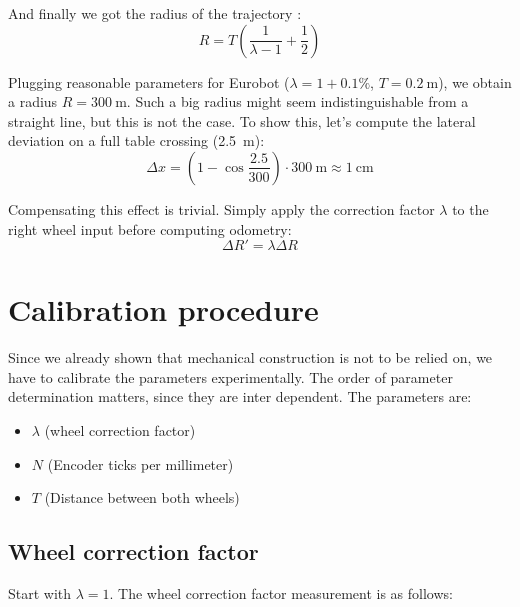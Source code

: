 \documentclass[a4paper, 10pt]{article}
\begin{document}
And finally we got the radius of the trajectory :
\begin{equation*}
    R = T \left(\frac{1}{\lambda - 1}  + \frac{1}{2}\right)
\end{equation*}

Plugging reasonable parameters for Eurobot ($\lambda=1+0.1\%$, $T = \SI{0.2}{\meter}$), we obtain a radius $R = \SI{300}{\meter}$.
Such a big radius might seem indistinguishable from a straight line, but this is not the case.
To show this, let's compute the lateral deviation on a full table crossing (\SI{2.5}{\meter}):
\begin{equation*}
    \Delta x = \left( 1 - \cos \frac{2.5}{300} \right) \cdot \SI{300}{\meter} \approx \SI{1}{\centi\meter}
\end{equation*}


Compensating this effect is trivial.
Simply apply the correction factor $\lambda$ to the right wheel input before computing odometry:
\begin{equation}
    \Delta R' = \lambda \Delta R
\end{equation}

\section{Calibration procedure}
Since we already shown that mechanical construction is not to be relied on, we have to calibrate the parameters experimentally.
The order of parameter determination matters, since they are inter dependent.
The parameters are:
\begin{itemize}
    \item $\lambda$ (wheel correction factor)
    \item $N$ (Encoder ticks per millimeter)
    \item $T$ (Distance between both wheels)
\end{itemize}

\subsection{Wheel correction factor}
Start with $\lambda=1$.
The wheel correction factor measurement is as follows:
\end{document}
